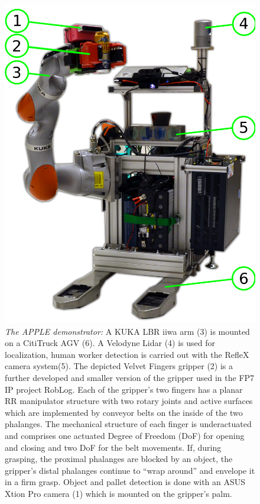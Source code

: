 \begin{figure}[t!]
\begin{center}
\includegraphics[width =0.8\linewidth]{figs/apple_demonstrator}
\caption{\textit{The APPLE demonstrator:} A KUKA LBR iiwa arm (3) is mounted on a CitiTruck AGV
  (6). A Velodyne Lidar (4) is used for localization, human worker detection is carried out with the
  RefleX camera system(5). The depicted Velvet Fingers gripper (2) is a further developed and
  smaller version of the gripper used in the FP7 IP project RobLog. Each of the gripper’s two
  fingers has a planar RR manipulator structure with two rotary joints and active surfaces which are
  implemented by conveyor belts on the inside of the two phalanges. The mechanical structure of each
  finger is underactuated and comprises one actuated Degree of Freedom (DoF) for opening and closing
  and two DoF for the belt movements. If, during grasping, the proximal phalanges are blocked by an
  object, the gripper’s distal phalanges continue to “wrap around” and envelope it in a firm
  grasp. Object and pallet detection is done with an ASUS Xtion Pro camera (1) which is mounted on
  the gripper's palm.}
\label{fig:robot}
\vspace{-0.5cm}
\end{center}
\end{figure}
%